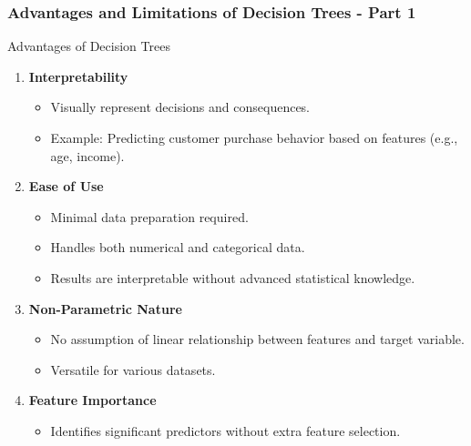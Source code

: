 \documentclass[aspectratio=169]{beamer}
\begin{document}
\begin{frame}[fragile]
    \frametitle{Advantages and Limitations of Decision Trees - Part 1}
    
    \begin{block}{Advantages of Decision Trees}
        \begin{enumerate}
            \item \textbf{Interpretability}
            \begin{itemize}
                \item Visually represent decisions and consequences.
                \item Example: Predicting customer purchase behavior based on features (e.g., age, income).
            \end{itemize}

            \item \textbf{Ease of Use}
            \begin{itemize}
                \item Minimal data preparation required.
                \item Handles both numerical and categorical data.
                \item Results are interpretable without advanced statistical knowledge.
            \end{itemize}

            \item \textbf{Non-Parametric Nature}
            \begin{itemize}
                \item No assumption of linear relationship between features and target variable.
                \item Versatile for various datasets.
            \end{itemize}

            \item \textbf{Feature Importance}
            \begin{itemize}
                \item Identifies significant predictors without extra feature selection.
            \end{itemize}
        \end{enumerate}
    \end{block}
\end{frame}
\end{document}
